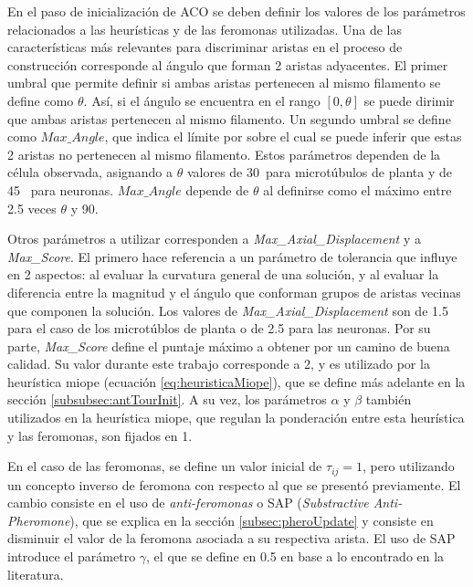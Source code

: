 En el paso de inicializaci\'on de ACO se deben definir los valores de los par\'ametros relacionados a las heur\'isticas y de las feromonas utilizadas. Una de las caracter\'isticas m\'as relevantes para discriminar aristas en el proceso de construcci\'on corresponde al \'angulo que forman 2 aristas adyacentes.
El primer umbral que permite definir si ambas aristas pertenecen al mismo filamento se define como $\theta$. As\'i, si el \'angulo se encuentra en el rango $[0, \theta]$ se puede dirimir que ambas aristas pertenecen al mismo filamento. Un segundo umbral se define como $Max\_Angle$, que indica el l\'imite por sobre el cual se puede inferir que estas 2 aristas no pertenecen al mismo filamento. Estos par\'ametros dependen de la c\'elula observada, asignando a $\theta$ valores de 30\textdegree ~para microt\'ubulos de planta y de 45\textdegree~ para neuronas. $Max\_Angle$ depende de $\theta$ al definirse como el m\'aximo entre 2.5 veces $\theta$ y 90\textdegree.

Otros par\'ametros a utilizar corresponden a {\it Max\_Axial\_Displacement} y a {\it Max\_Score}. El primero hace referencia a un par\'ametro de tolerancia que influye en 2 aspectos: al evaluar la curvatura general de una soluci\'on, y al evaluar la diferencia entre la magnitud y el \'angulo que conforman grupos de aristas vecinas que componen la soluci\'on. Los valores de {\it Max\_Axial\_Displacement} son de 1.5 para el caso de los microt\'ublos de planta o de 2.5 para las neuronas. Por su parte, {\it Max\_Score} define el puntaje m\'aximo a obtener por un camino de buena calidad. Su valor durante este trabajo corresponde a 2, y es utilizado por la heur\'istica miope (ecuaci\'on \ref{eq:heuristicaMiope}), que se define m\'as adelante en la secci\'on \ref{subsubsec:antTourInit}. A su vez, los par\'ametros $\alpha$ y $\beta$ tambi\'en utilizados en la heur\'istica miope, que regulan la ponderaci\'on entre esta heur\'istica y las feromonas, son fijados en 1.


En el caso de las feromonas, se define un valor inicial de $\tau_{ij} = 1$, pero utilizando un concepto inverso de feromona con respecto al que se present\'o previamente. El cambio consiste en el uso de {\it anti-feromonas} o SAP ({\it Substractive Anti-Pheromone})\cite{montgomery2002anti}, que se explica en la secci\'on \ref{subsec:pheroUpdate} y consiste en disminuir el valor de la feromona asociada a su respectiva arista. El uso de SAP introduce el par\'ametro $\gamma$, el que se define en 0.5 en base a lo encontrado en la literatura.

